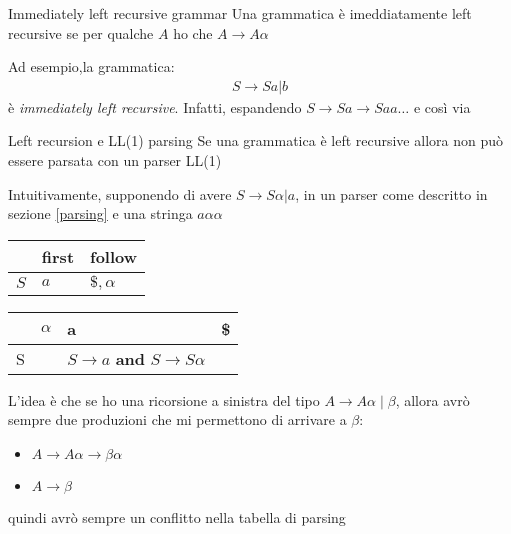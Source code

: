 \begin{definizione}{Immediately left recursive grammar}
	Una grammatica è imeddiatamente left recursive se per qualche $ A $ ho che $ A \rightarrow A \alpha  $
\end{definizione}
Ad esempio,la grammatica:
\begin{align*}
	S \rightarrow Sa | b
\end{align*}
è \textit{immediately left recursive}. Infatti, espandendo $ S \rightarrow Sa \rightarrow Saa  \ldots  $ e così via

\begin{teorema}{Left recursion e LL(1) parsing}
	Se una grammatica è left recursive allora non può essere parsata con un parser LL(1)
\end{teorema}
Intuitivamente, supponendo di avere $ S \rightarrow S \alpha | a $, in un parser come descritto in sezione \ref{parsing} e una stringa $ a \alpha \alpha $
\vskip3mm
\begin{minipage}[t]{0.48\textwidth}
	\begin{center}
		\begin{tabular}{l|ll}
			\toprule
			      & first & follow          \\
			\midrule
			$ S $ & $ a $ & $ \$, \alpha  $ \\
			\bottomrule
		\end{tabular}
	\end{center}
\end{minipage}
%
\begin{minipage}[t]{0.48\textwidth}
	\begin{center}
		\begin{tabular}{l|l|l|l}
			\toprule
			  & $ \alpha $ & a                                                             & \$ \\
			\midrule
			S &            & $ S \rightarrow a $  \textbf{and} $ S \rightarrow S \alpha  $ &    \\
			\bottomrule
		\end{tabular}
	\end{center}
\end{minipage}
\vskip3mm
L'idea è che se ho una ricorsione a sinistra del tipo $ A \rightarrow A \alpha \mid \beta   $, allora avrò sempre due produzioni che mi permettono di arrivare a $ \beta $:
\begin{itemize}
	\item $ A \rightarrow A \alpha  \rightarrow  \beta \alpha  $
	\item $ A \rightarrow \beta $
\end{itemize}
quindi avrò sempre un conflitto nella tabella di parsing


